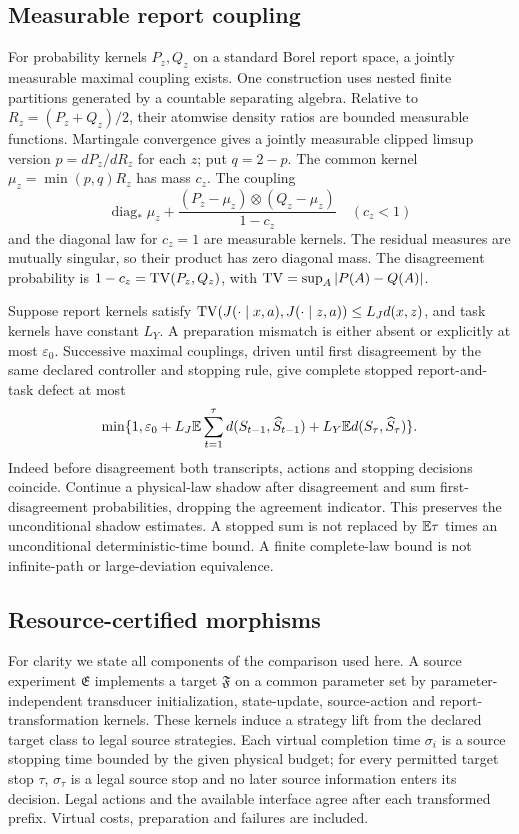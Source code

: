 \subsection{Measurable report coupling}
For probability kernels $P_z,Q_z$ on a standard Borel report space, a jointly measurable maximal coupling exists. One construction uses nested finite partitions generated by a countable separating algebra. Relative to $R_z=(P_z+Q_z)/2$, their atomwise density ratios are bounded measurable functions. Martingale convergence gives a jointly measurable clipped limsup version $p=dP_z/dR_z$ for each $z$; put $q=2-p$. The common kernel $\mu_z=\min(p,q)R_z$ has mass $c_z$. The coupling
\[
 \operatorname{diag}_*\mu_z+
 \frac{(P_z-\mu_z)\otimes(Q_z-\mu_z)}{1-c_z}\quad(c_z<1)
\]
and the diagonal law for $c_z=1$ are measurable kernels. The residual measures are mutually singular, so their product has zero diagonal mass. The disagreement probability is $1-c_z=\operatorname{TV}(P_z,Q_z)$, with $\operatorname{TV}=\sup_A|P(A)-Q(A)|$.

Suppose report kernels satisfy $\operatorname{TV}(J(\cdot\mid x,a),J(\cdot\mid z,a))\le L_Jd(x,z)$, and task kernels have constant $L_Y$. A preparation mismatch is either absent or explicitly at most $\varepsilon_0$. Successive maximal couplings, driven until first disagreement by the same declared controller and stopping rule, give complete stopped report-and-task defect at most
\begin{equation}\label{eq:reporttv}
 \min\{1,\varepsilon_0+L_J\mathbb E\sum_{t=1}^\tau d(S_{t-1},\widehat S_{t-1})
                         +L_Y\mathbb E d(S_\tau,\widehat S_\tau)\}.
\end{equation}
Indeed before disagreement both transcripts, actions and stopping decisions coincide. Continue a physical-law shadow after disagreement and sum first-disagreement probabilities, dropping the agreement indicator. This preserves the unconditional shadow estimates. A stopped sum is not replaced by $\mathbb E\tau$ times an unconditional deterministic-time bound. A finite complete-law bound is not infinite-path or large-deviation equivalence.

\subsection{Resource-certified morphisms}
For clarity we state all components of the comparison used here. A source experiment $\mathfrak E$ implements a target $\mathfrak F$ on a common parameter set by parameter-independent transducer initialization, state-update, source-action and report-transformation kernels. These kernels induce a strategy lift from the declared target class to legal source strategies. Each virtual completion time $\sigma_i$ is a source stopping time bounded by the given physical budget; for every permitted target stop $\tau$, $\sigma_\tau$ is a legal source stop and no later source information enters its decision. Legal actions and the available interface agree after each transformed prefix. Virtual costs, preparation and failures are included.

